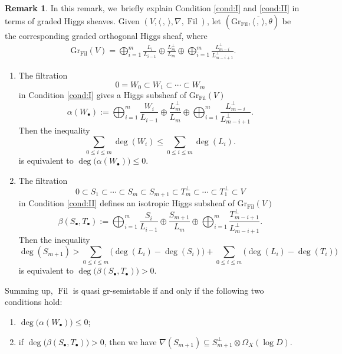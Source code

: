 \documentclass[11pt]{article}
\numberwithin{equation}{section}
\newcommand{\sbullet}{{\scriptscriptstyle\bullet}}
\newcommand{\grsemistable}{gr\nobreakdash-semi\-stable\xspace}
\DeclareMathOperator{\Filt}{Fil}
\newcommand{\Gr}{\mathrm{Gr}}
\theoremstyle{plain}
\theoremstyle{definition}
\newtheorem{rem}[thm]{Remark}
\begin{document}
\begin{rem}\label{explainregular}
In this remark, we~briefly explain Condition \eqref{cond:I} and \eqref{cond:II} in terms of graded Higgs sheaves. Given $(V, \langle \,, \, \rangle, \nabla, \Filt)$, let $(\Gr_{\Filt}, \overline{\langle \,, \, \rangle}, \theta)$ be the corresponding graded orthogonal Higgs sheaf, where
\begin{align*}
\Gr_{\Filt}(V)=\mathop{\bigoplus}_{i=1}^{m} \frac{L_i}{L_{i-1}}\oplus \frac{L_m^\perp}{L_m}\oplus \mathop{\bigoplus}_{i=1}^{m} \frac{L_{m-i}^\perp}{L_{m-i+1}^\perp}.
\end{align*}

\begin{enumerate}
\item The filtration
\[
0=W_0\subset W_1 \subset \cdots\subset W_m
\]
in Condition \eqref{cond:I} gives a Higgs subsheaf of $\Gr_{\Filt}(V)$
\[
\alpha(W_\sbullet):=\mathop{\bigoplus}_{i=1}^{m} \frac{W_i}{L_{i-1}}\oplus \frac{L_m^\perp}{L_m}\oplus \mathop{\bigoplus}_{i=1}^{m} \frac{L_{m-i}^\perp}{L_{m-i+1}^\perp}.
\]
Then the inequality
\[
\sum_{0\leq i\leq m}\deg(W_i)\leqslant\sum_{0\leq i\leq m}\deg(L_i).
\]
is equivalent to $\deg\big(\alpha(W_\sbullet)\big)\leq 0$. 
\item The filtration
\[
0\subset S_1 \subset \cdots\subset S_m\subset S_{m+1}\subset T_m^\perp\subset\cdots \subset T_1^\perp\subset V
\]
in Condition \eqref{cond:II} defines an isotropic Higgs subsheaf of $\Gr_{\Filt}(V)$
\[
\beta(S_\sbullet,T_\sbullet):=\mathop{\bigoplus}_{i=1}^{m} \frac{S_i}{L_{i-1}}\oplus \frac{S_{m+1}}{L_m}\oplus \mathop{\bigoplus}_{i=1}^{m} \frac{T_{m-i+1}^\perp}{L_{m-i+1}^\perp}.
\]
Then the inequality
\[
\deg(S_{m+1})>\sum_{0\leq i\leq m}\big(\deg(L_i)-\deg(S_i)\big)+\sum_{0\leq i\leq m}\big(\deg(L_i)-\deg(T_i)\big)
\]
is equivalent to $\deg\big(\beta(S_\sbullet,T_\sbullet)\big)>0$.
\end{enumerate}

Summing up, $\Filt$ is quasi \grsemistable if and only if the following two conditions hold:
\begin{enumerate}
\item $\deg\big(\alpha(W_\sbullet)\big)\leq 0$;

\item if $\deg\big(\beta(S_\sbullet,T_\sbullet)\big)>0$, then we have $\nabla(S_{m+1})\subseteq S_{m+1}^\perp \otimes\Omega_X(\log D)$.
\end{enumerate}
\end{rem}
\end{document}

